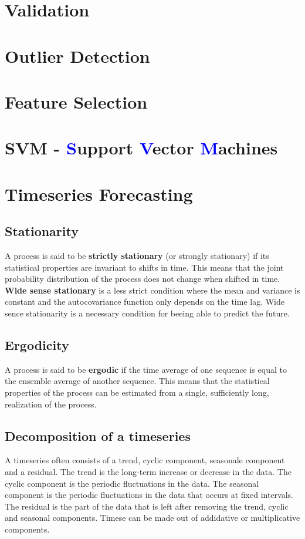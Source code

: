 \section{Validation}

\section{Outlier Detection}

\section{Feature Selection}

\section{SVM - \textcolor{blue}{S}upport \textcolor{blue}{V}ector \textcolor{blue}{M}achines}

\section{Timeseries Forecasting}

\subsection{Stationarity}
A process is said to be \textbf{strictly stationary} (or strongly stationary) if its statistical properties are invariant to shifts in time. This means that the joint probability distribution of the process does not change when shifted in time. \textbf{Wide sense stationary} is a less strict condition where the mean and variance is constant and the autocovariance function only depends on the time lag. Wide sence stationarity is a necessary condition for beeing able to predict the future.


\subsection{Ergodicity}
A process is said to be \textbf{ergodic} if the time average of one sequence is equal to the ensemble average of another sequence. This means that the statistical properties of the process can be estimated from a single, sufficiently long, realization of the process. \newline



\subsection {Decomposition of a timeseries}
A timeseries often consists of a trend, cyclic component, seasonale component and a residual. The trend is the long-term increase or decrease in the data. The cyclic component is the periodic fluctuations in the data. The seasonal component is the periodic fluctuations in the data that occurs at fixed intervals. The residual is the part of the data that is left after removing the trend, cyclic and seasonal components. Timese can be made out of addidative or multiplicative components. \newline


